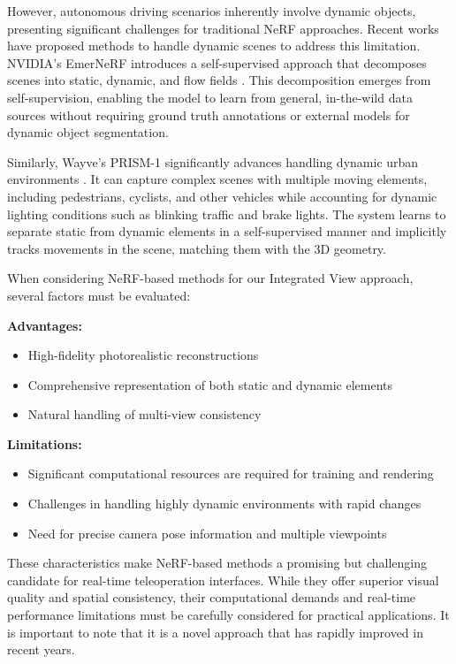 However, autonomous driving scenarios inherently involve dynamic objects, presenting significant challenges for traditional NeRF approaches. Recent works have proposed methods to handle dynamic scenes to address this limitation. NVIDIA's EmerNeRF introduces a self-supervised approach that decomposes scenes into static, dynamic, and flow fields \cite{yang2023emernerf}. This decomposition emerges from self-supervision, enabling the model to learn from general, in-the-wild data sources without requiring ground truth annotations or external models for dynamic object segmentation.

Similarly, Wayve's PRISM-1 significantly advances handling dynamic urban environments \cite{prism2024wayve}. It can capture complex scenes with multiple moving elements, including pedestrians, cyclists, and other vehicles while accounting for dynamic lighting conditions such as blinking traffic and brake lights. The system learns to separate static from dynamic elements in a self-supervised manner and implicitly tracks movements in the scene, matching them with the 3D geometry.

When considering NeRF-based methods for our Integrated View approach, several factors must be evaluated:

\textbf{Advantages:}
\begin{itemize}
    \item High-fidelity photorealistic reconstructions
    \item Comprehensive representation of both static and dynamic elements
    \item Natural handling of multi-view consistency
\end{itemize}

\textbf{Limitations:}
\begin{itemize}
    \item Significant computational resources are required for training and rendering
    \item Challenges in handling highly dynamic environments with rapid changes
    \item Need for precise camera pose information and multiple viewpoints
\end{itemize}

These characteristics make NeRF-based methods a promising but challenging candidate for real-time teleoperation interfaces. While they offer superior visual quality and spatial consistency, their computational demands and real-time performance limitations must be carefully considered for practical applications. It is important to note that it is a novel approach that has rapidly improved in recent years.

